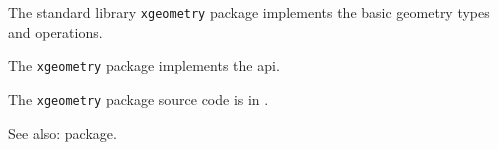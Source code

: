 
The standard library {\tt xgeometry} package implements the basic geometry types and operations.

The {\tt xgeometry} package implements the  api.

The {\tt xgeometry} package source code is in .

See also:   package.
